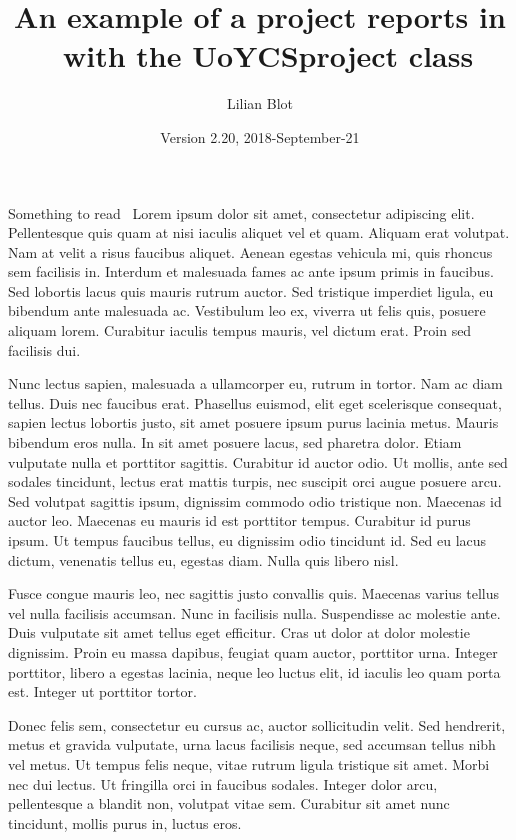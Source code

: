 \documentclass{UoYCSproject}
\author{Lilian Blot}
\title{An example of a project reports in \LaTeXe\ with the   \textsf{UoYCSproject} class}
\date{Version 2.20, 2018-September-21}
\begin{document}
\maketitle
\listoffigures
\listoftables

\begin{summary}
Something to read~\parencite{zobel2015writing} Lorem ipsum dolor sit amet, consectetur adipiscing elit. Pellentesque quis quam at nisi iaculis aliquet vel et quam. Aliquam erat volutpat. Nam at velit a risus faucibus aliquet. Aenean egestas vehicula mi, quis rhoncus sem facilisis in. Interdum et malesuada fames ac ante ipsum primis in faucibus. Sed lobortis lacus quis mauris rutrum auctor. Sed tristique imperdiet ligula, eu bibendum ante malesuada ac. Vestibulum leo ex, viverra ut felis quis, posuere aliquam lorem. Curabitur iaculis tempus mauris, vel dictum erat. Proin sed facilisis dui.

Nunc lectus sapien, malesuada a ullamcorper eu, rutrum in tortor. Nam ac diam tellus. Duis nec faucibus erat. Phasellus euismod, elit eget scelerisque consequat, sapien lectus lobortis justo, sit amet posuere ipsum purus lacinia metus. Mauris bibendum eros nulla. In sit amet posuere lacus, sed pharetra dolor. Etiam vulputate nulla et porttitor sagittis. Curabitur id auctor odio. Ut mollis, ante sed sodales tincidunt, lectus erat mattis turpis, nec suscipit orci augue posuere arcu. Sed volutpat sagittis ipsum, dignissim commodo odio tristique non. Maecenas id auctor leo. Maecenas eu mauris id est porttitor tempus. Curabitur id purus ipsum. Ut tempus faucibus tellus, eu dignissim odio tincidunt id. Sed eu lacus dictum, venenatis tellus eu, egestas diam. Nulla quis libero nisl.

Fusce congue mauris leo, nec sagittis justo convallis quis. Maecenas varius tellus vel nulla facilisis accumsan. Nunc in facilisis nulla. Suspendisse ac molestie ante. Duis vulputate sit amet tellus eget efficitur. Cras ut dolor at dolor molestie dignissim. Proin eu massa dapibus, feugiat quam auctor, porttitor urna. Integer porttitor, libero a egestas lacinia, neque leo luctus elit, id iaculis leo quam porta est. Integer ut porttitor tortor.

Donec felis sem, consectetur eu cursus ac, auctor sollicitudin velit. Sed hendrerit, metus et gravida vulputate, urna lacus facilisis neque, sed accumsan tellus nibh vel metus. Ut tempus felis neque, vitae rutrum ligula tristique sit amet. Morbi nec dui lectus. Ut fringilla orci in faucibus sodales. Integer dolor arcu, pellentesque a blandit non, volutpat vitae sem. Curabitur sit amet nunc tincidunt, mollis purus in, luctus eros.


\end{summary}
\end{document}
